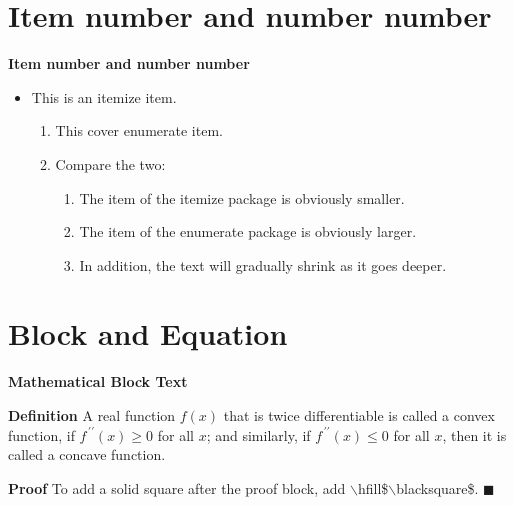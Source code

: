 \documentclass[12pt, aspectratio=169]{beamer}
\begin{document}
\section{Item number and number number}

\linespread{1} 
\begin{frame}[<+>]{\textbf{Item number and number number}}
\linespread{1.5} 

	\begin{itemize}[]
		\item This is an itemize item.
		\begin{enumerate}[] 
			\item This cover enumerate item.
			\item Compare the two:
				\begin{enumerate}[1] 
					\item The item of the itemize package is obviously smaller.
					\item The item of the enumerate package is obviously larger.
					\item In addition, the text will gradually shrink as it goes deeper.
				\end{enumerate}
		\end{enumerate}
	\end{itemize}
	
\end{frame}

\section{Block and Equation}
\linespread{1} 
\begin{frame}{\textbf{Mathematical Block Text}}
\linespread{1.5}

	\begin{block}{\textbf{Definition}} 
		A real function $f\left(x\right)$ that is twice differentiable is called a convex function,
		if $f^{\,\prime\prime}\!\left(x\right)\ge0$ for all $x$;
		and similarly, if $f^{\,\prime\prime}\!\left(x\right)\le0$ for all $x$,
		then it is called a concave function.
	\end{block}
	
	\begin{block}{\textbf{Proof}} 
		To add a solid square after the proof block, add $\backslash$hfill\$$\backslash$blacksquare\$.
		\hfill$\blacksquare$
	\end{block}
	
\end{frame}
\end{document}
